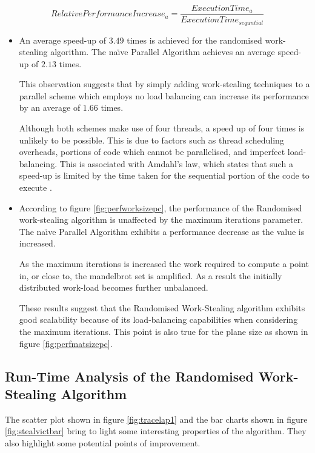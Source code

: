 \[ RelativePerformanceIncrease_a = \frac{ExecutionTime_a}{ExecutionTime_{sequntial}}\]

\begin{itemize}
\item 
    An average speed-up of \(3.49\) times is achieved for the randomised work-stealing algorithm. The na\"{\i}ve Parallel Algorithm
    achieves an average speed-up of \(2.13\) times. 

    This observation suggests that by simply adding work-stealing techniques to a parallel scheme which employs no 
    load balancing can increase its performance by an average of \(1.66\) times.
    
    Although both schemes make use of four threads, a speed up of four times is unlikely to be possible.
    This is due to factors such as thread scheduling overheads, portions of code which cannot be
    parallelised, and imperfect load-balancing. 
    This is associated with Amdahl's law, which states that such a speed-up is limited by the time taken for the sequential 
    portion of the code to execute \cite{pathen}.

\item
    According to figure \ref{fig:perfworksizepc}, the performance of the Randomised work-stealing algorithm is unaffected 
    by the maximum iterations parameter. 
    The na\"{\i}ve Parallel Algorithm exhibits a performance decrease as the value is increased.
    
    As the maximum iterations is increased the work required to compute a point in, or close to, the mandelbrot set 
    is amplified. As a result the initially distributed work-load becomes further unbalanced.

    These results suggest that the Randomised Work-Stealing algorithm exhibits good scalability because of its 
    load-balancing capabilities when considering the maximum iterations. This point is also true for the 
    plane size as shown in figure \ref{fig:perfmatsizepc}.

\end{itemize}




\subsection{Run-Time Analysis of the Randomised Work-Stealing Algorithm}

The scatter plot shown in figure \ref{fig:tracelap1} and the bar charts shown in figure \ref{fig:stealvictbar} 
bring to light some interesting properties of the algorithm.
They also highlight some potential points of improvement.
\\

